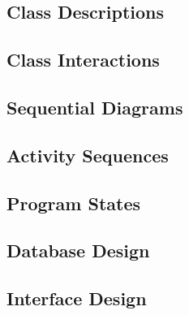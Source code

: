 \documentclass[12pt]{article}
\begin{document}
\subsection{Class Descriptions}


\subsection{Class Interactions}


\subsection{Sequential Diagrams}


\subsection{Activity Sequences}


\subsection{Program States}


\subsection{Database Design}


\subsection{Interface Design}

\end{document}
